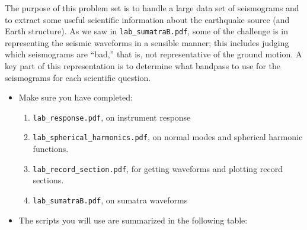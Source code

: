 \documentclass[11pt,titlepage,fleqn]{article}
\begin{document}
\begin{spacing}{1.0}

The purpose of this problem set is to handle a large data set of seismograms and to extract some useful scientific information about the earthquake source (and Earth structure). As we saw in \verb+lab_sumatraB.pdf+, some of the challenge is in representing the seismic waveforms in a sensible manner; this includes judging which seismograms are ``bad,'' that is, not representative of the ground motion. A key part of this representation is to determine what bandpass to use for the seismograms for each scientific question.

\begin{itemize}


\item Make sure you have completed:
%
\begin{enumerate}
\item \verb+lab_response.pdf+, on instrument response

\item \verb+lab_spherical_harmonics.pdf+, on normal modes and spherical harmonic functions.

\item \verb+lab_record_section.pdf+, for getting waveforms and plotting record sections.

\item \verb+lab_sumatraB.pdf+, on sumatra waveforms
\end{enumerate}


\item The scripts you will use are summarized in the following table:


\end{itemize}
\end{spacing}
\end{document}

